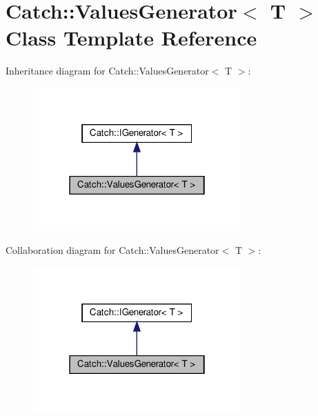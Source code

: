 \hypertarget{classCatch_1_1ValuesGenerator}{}\section{Catch\+:\+:Values\+Generator$<$ T $>$ Class Template Reference}
\label{classCatch_1_1ValuesGenerator}


Inheritance diagram for Catch\+:\+:Values\+Generator$<$ T $>$\+:
\nopagebreak
\begin{figure}[H]
\begin{center}
\leavevmode
\includegraphics[width=226pt]{classCatch_1_1ValuesGenerator__inherit__graph}
\end{center}
\end{figure}


Collaboration diagram for Catch\+:\+:Values\+Generator$<$ T $>$\+:
\nopagebreak
\begin{figure}[H]
\begin{center}
\leavevmode
\includegraphics[width=226pt]{classCatch_1_1ValuesGenerator__coll__graph}
\end{center}
\end{figure}
